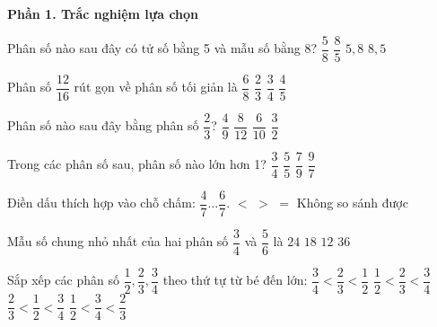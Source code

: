 \textbf{Phần 1. Trắc nghiệm lựa chọn}

\begin{ex} %
Phân số nào sau đây có tử số bằng 5 và mẫu số bằng 8?
\choice
{\True $\dfrac{5}{8}$}
{$\dfrac{8}{5}$}
{$5{,}8$}
{$8{,}5$}
\end{ex}

\begin{ex} %
Phân số $\dfrac{12}{16}$ rút gọn về phân số tối giản là
\choice
{$\dfrac{6}{8}$}
{$\dfrac{2}{3}$}
{\True $\dfrac{3}{4}$}
{$\dfrac{4}{5}$}
\end{ex}

\begin{ex} %
Phân số nào sau đây bằng phân số $\dfrac{2}{3}$?
\choice
{$\dfrac{4}{9}$}
{\True $\dfrac{8}{12}$}
{$\dfrac{6}{10}$}
{$\dfrac{3}{2}$}
\end{ex}

\begin{ex} %
Trong các phân số sau, phân số nào lớn hơn 1?
\choice
{$\dfrac{3}{4}$}
{$\dfrac{5}{5}$}
{$\dfrac{7}{9}$}
{\True $\dfrac{9}{7}$}
\end{ex}

\begin{ex} %
Điền dấu thích hợp vào chỗ chấm: $\dfrac{4}{7} \dots \dfrac{6}{7}$.
\choice
{\True $<$}
{$>$}
{$=$}
{Không so sánh được}
\end{ex}

\begin{ex} %
Mẫu số chung nhỏ nhất của hai phân số $\dfrac{3}{4}$ và $\dfrac{5}{6}$ là
\choice
{$24$}
{$18$}
{\True $12$}
{$36$}
\end{ex}

\begin{ex} %
Sắp xếp các phân số $\dfrac{1}{2}, \dfrac{2}{3}, \dfrac{3}{4}$ theo thứ tự từ bé đến lớn:
\choice
{$\dfrac{3}{4} < \dfrac{2}{3} < \dfrac{1}{2}$}
{\True $\dfrac{1}{2} < \dfrac{2}{3} < \dfrac{3}{4}$}
{$\dfrac{2}{3} < \dfrac{1}{2} < \dfrac{3}{4}$}
{$\dfrac{1}{2} < \dfrac{3}{4} < \dfrac{2}{3}$}
\end{ex}

